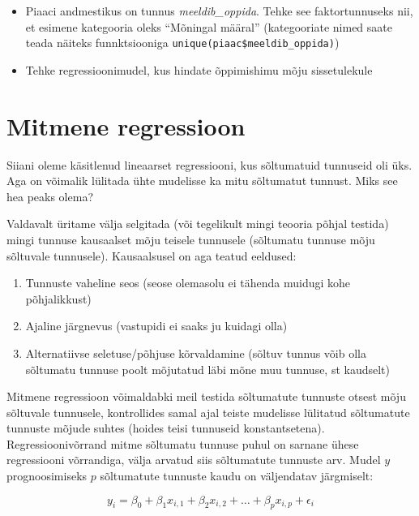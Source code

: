 \documentclass[
]{book}
\providecommand{\tightlist}{%
  \setlength{\itemsep}{0pt}\setlength{\parskip}{0pt}}
\begin{document}
\begin{itemize}
\tightlist
\item
  Piaaci andmestikus on tunnus \emph{meeldib\_oppida}. Tehke see faktortunnuseks nii, et esimene kategooria oleks ``Mõningal määral'' (kategooriate nimed saate teada näiteks funnktsiooniga \texttt{unique(piaac\$meeldib\_oppida)})
\item
  Tehke regressioonimudel, kus hindate õppimishimu mõju sissetulekule
\end{itemize}

\hypertarget{mitmene-regressioon}{%
\section{Mitmene regressioon}\label{mitmene-regressioon}}

Siiani oleme käsitlenud lineaarset regressiooni, kus sõltumatuid tunnuseid oli üks. Aga on võimalik lülitada ühte mudelisse ka mitu sõltumatut tunnust. Miks see hea peaks olema?

Valdavalt üritame välja selgitada (või tegelikult mingi teooria põhjal testida) mingi tunnuse kausaalset mõju teisele tunnusele (sõltumatu tunnuse mõju sõltuvale tunnusele). Kausaalsusel on aga teatud eeldused:

\begin{enumerate}
\def\labelenumi{\arabic{enumi}.}
\tightlist
\item
  Tunnuste vaheline seos (seose olemasolu ei tähenda muidugi kohe põhjalikkust)\\
\item
  Ajaline järgnevus (vastupidi ei saaks ju kuidagi olla)\\
\item
  Alternatiivse seletuse/põhjuse kõrvaldamine (sõltuv tunnus võib olla sõltumatu tunnuse poolt mõjutatud läbi mõne muu tunnuse, st kaudselt)
\end{enumerate}

Mitmene regressioon võimaldabki meil testida sõltumatute tunnuste otsest mõju sõltuvale tunnusele, kontrollides samal ajal teiste mudelisse lülitatud sõltumatute tunnuste mõjude suhtes (hoides teisi tunnuseid konstantsetena). Regressioonivõrrand mitme sõltumatu tunnuse puhul on sarnane ühese regressiooni võrrandiga, välja arvatud siis sõltumatute tunnuste arv. Mudel \(y\) prognoosimiseks \(p\) sõltumatute tunnuste kaudu on väljendatav järgmiselt:

\begin{equation}  
y_{i}=\beta_{0}+\beta_{1}x_{i,1}+\beta_{2}x_{i,2}+\ldots+\beta_{p}x_{i,p}+\epsilon_{i}
\end{equation}
\end{document}
